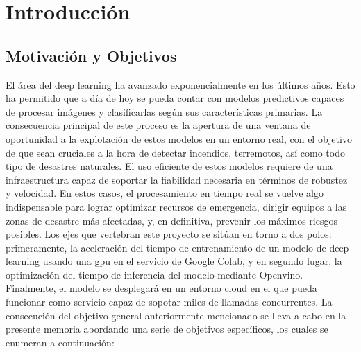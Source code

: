 \cleardoublepage


\chapter{Introducción}
\label{ch:chapter1}


\section{Motivación y Objetivos}\label{sec:motivación-y-objetivos}

El área del deep learning ha avanzado exponencialmente en los últimos años.
Esto ha permitido que a día de hoy se pueda contar con modelos predictivos capaces de procesar imágenes y clasificarlas según sus características primarias.
La consecuencia principal de este proceso es la apertura de una ventana de oportunidad a la explotación de estos modelos en un entorno real, con el objetivo de que sean cruciales a
la hora de detectar incendios, terremotos, así como todo tipo de desastres naturales.
El uso eficiente de estos modelos requiere de una infraestructura capaz de soportar la fiabilidad necesaria en términos de robustez y velocidad.
En estos casos, el procesamiento en tiempo real se vuelve algo indispensable para lograr optimizar recursos de emergencia, dirigir equipos a las zonas de desastre más afectadas,
y, en definitiva, prevenir los máximos riesgos posibles.
Los ejes que vertebran este proyecto se sitúan en torno a dos polos: primeramente, la aceleración del tiempo de entrenamiento de un modelo de deep learning usando una gpu en el
servicio de Google Colab, y en segundo lugar, la optimización del tiempo de inferencia del modelo mediante Openvino.
Finalmente, el modelo se desplegará en un entorno cloud en el que pueda funcionar como servicio capaz de sopotar miles de llamadas concurrentes.
La consecución del objetivo general anteriormente mencionado se lleva a cabo en la presente memoria abordando una serie de objetivos específicos, los cuales se enumeran a
continuación:
